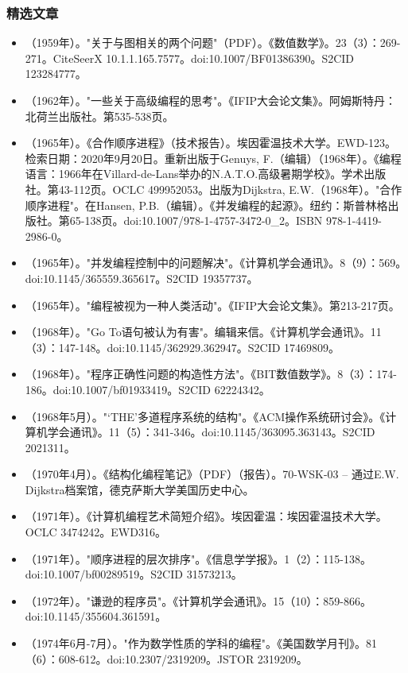\subsubsection{精选文章}
\begin{itemize}
\item （1959年）。"关于与图相关的两个问题"（PDF）。《数值数学》。23（3）：269-271。CiteSeerX 10.1.1.165.7577。doi:10.1007/BF01386390。S2CID 123284777。
\item （1962年）。"一些关于高级编程的思考"。《IFIP大会论文集》。阿姆斯特丹：北荷兰出版社。第535-538页。
\item （1965年）。《合作顺序进程》（技术报告）。埃因霍温技术大学。EWD-123。检索日期：2020年9月20日。重新出版于Genuys, F.（编辑）（1968年）。《编程语言：1966年在Villard-de-Lans举办的N.A.T.O.高级暑期学校》。学术出版社。第43-112页。OCLC 499952053。出版为Dijkstra, E.W.（1968年）。"合作顺序进程"。在Hansen, P.B.（编辑）。《并发编程的起源》。纽约：斯普林格出版社。第65-138页。doi:10.1007/978-1-4757-3472-0_2。ISBN 978-1-4419-2986-0。
\item （1965年）。"并发编程控制中的问题解决"。《计算机学会通讯》。8（9）：569。doi:10.1145/365559.365617。S2CID 19357737。
\item （1965年）。"编程被视为一种人类活动"。《IFIP大会论文集》。第213-217页。
\item （1968年）。"Go To语句被认为有害"。编辑来信。《计算机学会通讯》。11（3）：147-148。doi:10.1145/362929.362947。S2CID 17469809。
\item （1968年）。"程序正确性问题的构造性方法"。《BIT数值数学》。8（3）：174-186。doi:10.1007/bf01933419。S2CID 62224342。
\item （1968年5月）。"‘THE’多道程序系统的结构"。《ACM操作系统研讨会》。《计算机学会通讯》。11（5）：341-346。doi:10.1145/363095.363143。S2CID 2021311。
\item （1970年4月）。《结构化编程笔记》（PDF）（报告）。70-WSK-03 – 通过E.W. Dijkstra档案馆，德克萨斯大学美国历史中心。
\item （1971年）。《计算机编程艺术简短介绍》。埃因霍温：埃因霍温技术大学。OCLC 3474242。EWD316。
\item （1971年）。"顺序进程的层次排序"。《信息学学报》。1（2）：115-138。doi:10.1007/bf00289519。S2CID 31573213。
\item （1972年）。"谦逊的程序员"。《计算机学会通讯》。15（10）：859-866。doi:10.1145/355604.361591。
\item （1974年6月-7月）。"作为数学性质的学科的编程"。《美国数学月刊》。81（6）：608-612。doi:10.2307/2319209。JSTOR 2319209。

\end{itemize}
